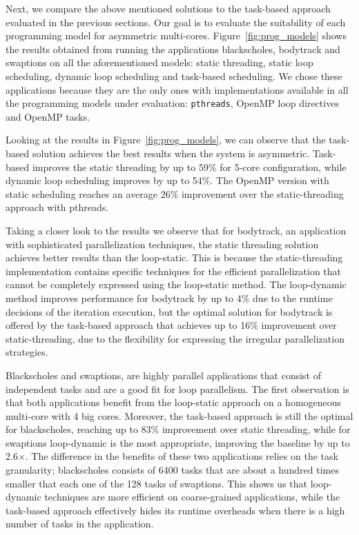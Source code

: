 Next, we compare the above mentioned solutions to the task-based approach evaluated in the previous 
sections. Our goal is to evaluate the suitability of each programming model for asymmetric 
multi-cores. 
Figure~\ref{fig:prog_models} shows the results obtained from running the applications 
blackscholes, bodytrack and swaptions on all the aforementioned models: static threading, static 
loop scheduling, dynamic loop scheduling and task-based scheduling. 
We chose these applications because they are the only ones with implementations available in all 
the programming models under evaluation: \texttt{pthreads}, OpenMP loop directives and OpenMP tasks.

Looking at the results in Figure~\ref{fig:prog_models}, we can observe that the task-based solution 
achieves the best results when the system is asymmetric. Task-based improves the static 
threading by up to 59\% for 5-core configuration, while dynamic loop scheduling improves by up to 
54\%.
The OpenMP version with static scheduling reaches an average 26\% 
improvement over the static-threading approach with pthreads.

Taking a closer look to the results we observe that for bodytrack, an application with sophisticated parallelization techniques, the static threading solution achieves better results than the loop-static.
This is because the static-threading implementation contains specific techniques for the efficient parallelization that cannot be completely expressed using the loop-static method.
The loop-dynamic method improves performance for bodytrack by up to 4\% due to the runtime decisions of the iteration execution, but the optimal solution for bodytrack is offered by the task-based approach that achieves up to 16\% improvement over static-threading, due to the flexibility for expressing the irregular parallelization strategies.
  
Blackscholes and swaptions, are highly parallel applications that consist of independent tasks and are a good fit for loop parallelism. 
The first observation is that both applications benefit from the loop-static approach on a homogeneous multi-core with 4 big cores. 
Moreover, the task-based approach is still the optimal for blackscholes, reaching up to 83\% improvement over static threading, while for swaptions loop-dynamic is the most appropriate, improving the baseline by up to 2.6$\times$.
The difference in the benefits of these two applications relies on the task granularity; blackscholes consists of 6400 tasks that are about a hundred times smaller that each one of the 128 tasks of swaptions. 
This shows us that loop-dynamic techniques are more efficient on coarse-grained applications, while the task-based approach effectively hides its runtime overheads when there is a high number of tasks in the application. 

